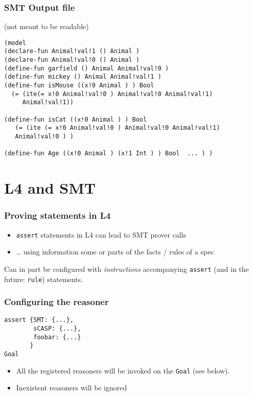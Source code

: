 \documentclass{beamer}
\begin{document}
\begin{frame}[fragile]\frametitle{SMT Output file}

   (not meant to be readable)
  \small
  \begin{verbatim}
(model 
(declare-fun Animal!val!1 () Animal ) 
(declare-fun Animal!val!0 () Animal ) 
(define-fun garfield () Animal Animal!val!0 ) 
(define-fun mickey () Animal Animal!val!1 ) 
(define-fun isMouse ((x!0 Animal ) ) Bool 
  (= (ite(= x!0 Animal!val!0 ) Animal!val!0 Animal!val!1) 
     Animal!val!1)) 

(define-fun isCat ((x!0 Animal ) ) Bool 
   (= (ite (= x!0 Animal!val!0 ) Animal!val!0 Animal!val!1)
   Animal!val!0 ) ) 

(define-fun Age ((x!0 Animal ) (x!1 Int ) ) Bool  ... ) )

\end{verbatim}  
\normalsize
\end{frame}


\section{L4 and SMT}

\begin{frame}[fragile]\frametitle{Proving statements in L4}

  \begin{itemize}
  \item \texttt{assert} statements in L4 can lead to SMT prover calls
  \item \dots{} using information some or parts of the facts / rules of a spec
  \end{itemize}


  \vspace{5mm}
  \vspace{5mm}
  
  Can in part be configured with \emph{instructions} accompanying
  \texttt{assert} (and in the future: \texttt{rule}) statements.

\end{frame}


\begin{frame}[fragile]\frametitle{Configuring the reasoner}

\begin{verbatim}
assert {SMT: {...},
        sCASP: {...},
        foobar: {...}
       }
Goal
\end{verbatim}

  \begin{itemize}
  \item All the registered reasoners will be invoked on the \texttt{Goal}
    (see below).
  \item Inexistent reasoners will be ignored
  \end{itemize}

\end{frame}
\end{document}
